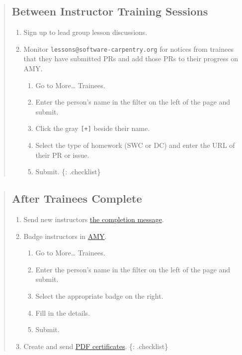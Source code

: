 \begin{quote}
\subsection{Between Instructor Training
Sessions}\label{between-instructor-training-sessions}

\begin{enumerate}
\def\labelenumi{\arabic{enumi}.}
\itemsep1pt\parskip0pt
\item
  Sign up to lead group lesson discussions.
\item
  Monitor \texttt{lessons@software-carpentry.org} for notices from
  trainees that they have submitted PRs and add those PRs to their
  progress on AMY.

  \begin{enumerate}
  \def\labelenumii{\arabic{enumii}.}
  \itemsep1pt\parskip0pt
  \item
    Go to More\ldots{} Trainees.
  \item
    Enter the person's name in the filter on the left of the page and
    submit.
  \item
    Click the gray \texttt{{[}+{]}} beside their name.
  \item
    Select the type of homework (SWC or DC) and enter the URL of their
    PR or issue.
  \item
    Submit. \{: .checklist\}
  \end{enumerate}
\end{enumerate}
\end{quote}

\begin{quote}
\subsection{After Trainees Complete}\label{after-trainees-complete}

\begin{enumerate}
\def\labelenumi{\arabic{enumi}.}
\itemsep1pt\parskip0pt
\item
  Send new instructors
  \href{\{\{\%20page.root\%20\}\}/files/messages/completion.txt}{the
  completion message}.
\item
  Badge instructors in \href{\{\{\%20site.amy\_site\%20\}\}/}{AMY}.

  \begin{enumerate}
  \def\labelenumii{\arabic{enumii}.}
  \itemsep1pt\parskip0pt
  \item
    Go to More\ldots{} Trainees.
  \item
    Enter the person's name in the filter on the left of the page and
    submit.
  \item
    Select the appropriate badge on the right.
  \item
    Fill in the details.
  \item
    Submit.
  \end{enumerate}
\item
  Create and send
  \href{\{\{\%20site.swc\_github\%20\}\}/certification}{PDF
  certificates}. \{: .checklist\}
\end{enumerate}
\end{quote}

